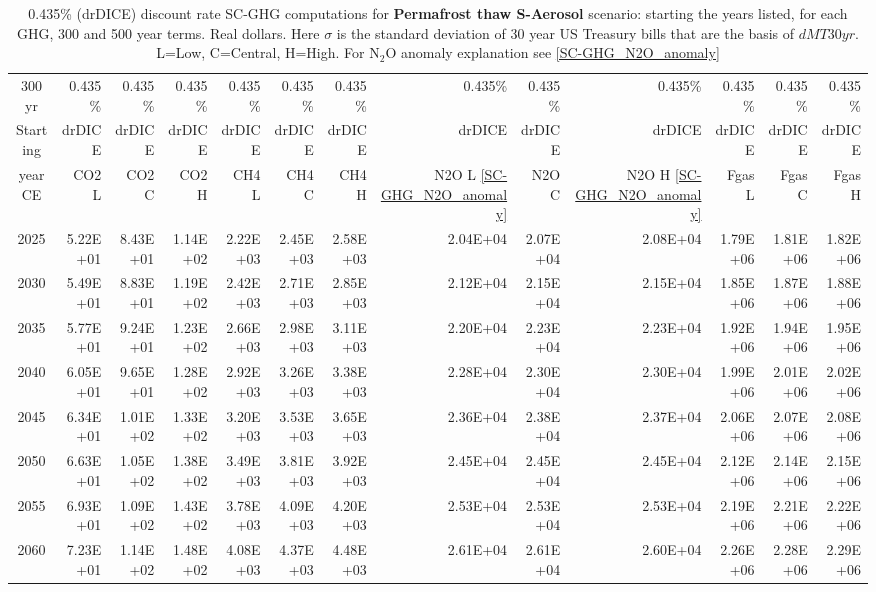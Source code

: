 \documentclass{article}
\begin{document}
\begin{table}
   \caption{0.435\% (drDICE) discount rate  SC-GHG computations for \textbf{Permafrost thaw S-Aerosol} scenario: starting the years listed, for each GHG, 300 and 500 year terms. Real dollars. Here $\sigma$ is the standard deviation of 30 year US Treasury bills that are the basis of $dMT30yr$. L=Low, C=Central, H=High. For N$_2$O anomaly explanation see \ref{SC-GHG_N2O_anomaly}} 
\label{PVs_300_yearSCC_SH0.435}
\small
\begin{tabular}{crrr|rrr|rrr|rrr}
300 yr   & 0.435\%  & 0.435\%  & 0.435\%  & 0.435\%  & 0.435\%  & 0.435\%  & 0.435\%  & 0.435\%  & 0.435\%  & 0.435\%  & 0.435\%  & 0.435\%  \\
Starting & drDICE   & drDICE   & drDICE   & drDICE   & drDICE   & drDICE   & drDICE   & drDICE   & drDICE   & drDICE   & drDICE   & drDICE   \\
year CE  & CO2 L    & CO2 C    & CO2 H    & CH4 L    & CH4 C    & CH4 H    & N2O L \ref{SC-GHG_N2O_anomaly}     & N2O C      & N2O H \ref{SC-GHG_N2O_anomaly}    & Fgas L   & Fgas C   & Fgas H   \\
2025     & 5.22E+01 & 8.43E+01 & 1.14E+02 & 2.22E+03 & 2.45E+03 & 2.58E+03 & 2.04E+04 & 2.07E+04 & 2.08E+04 & 1.79E+06 & 1.81E+06 & 1.82E+06 \\
2030     & 5.49E+01 & 8.83E+01 & 1.19E+02 & 2.42E+03 & 2.71E+03 & 2.85E+03 & 2.12E+04 & 2.15E+04 & 2.15E+04 & 1.85E+06 & 1.87E+06 & 1.88E+06 \\
2035     & 5.77E+01 & 9.24E+01 & 1.23E+02 & 2.66E+03 & 2.98E+03 & 3.11E+03 & 2.20E+04 & 2.23E+04 & 2.23E+04 & 1.92E+06 & 1.94E+06 & 1.95E+06 \\
2040     & 6.05E+01 & 9.65E+01 & 1.28E+02 & 2.92E+03 & 3.26E+03 & 3.38E+03 & 2.28E+04 & 2.30E+04 & 2.30E+04 & 1.99E+06 & 2.01E+06 & 2.02E+06 \\
2045     & 6.34E+01 & 1.01E+02 & 1.33E+02 & 3.20E+03 & 3.53E+03 & 3.65E+03 & 2.36E+04 & 2.38E+04 & 2.37E+04 & 2.06E+06 & 2.07E+06 & 2.08E+06 \\
2050     & 6.63E+01 & 1.05E+02 & 1.38E+02 & 3.49E+03 & 3.81E+03 & 3.92E+03 & 2.45E+04 & 2.45E+04 & 2.45E+04 & 2.12E+06 & 2.14E+06 & 2.15E+06 \\
2055     & 6.93E+01 & 1.09E+02 & 1.43E+02 & 3.78E+03 & 4.09E+03 & 4.20E+03 & 2.53E+04 & 2.53E+04 & 2.53E+04 & 2.19E+06 & 2.21E+06 & 2.22E+06 \\
2060     & 7.23E+01 & 1.14E+02 & 1.48E+02 & 4.08E+03 & 4.37E+03 & 4.48E+03 & 2.61E+04 & 2.61E+04 & 2.60E+04 & 2.26E+06 & 2.28E+06 & 2.29E+06 \\

\end{tabular}
\end{table}
\end{document}
